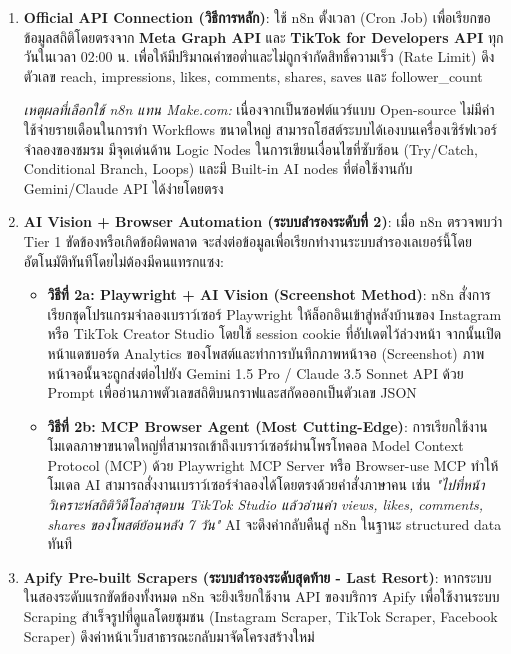 \documentclass[10pt,a4paper]{article}
\begin{document}
\begin{enumerate}[label=\bfseries Tier \arabic*:]
  \item \textbf{Official API Connection (วิธีการหลัก)}:
  ใช้ n8n ตั้งเวลา (Cron Job) เพื่อเรียกขอข้อมูลสถิติโดยตรงจาก \textbf{Meta Graph API} และ \textbf{TikTok for Developers API} ทุกวันในเวลา 02:00 น. เพื่อให้มีปริมาณคำขอต่ำและไม่ถูกจำกัดสิทธิ์ความเร็ว (Rate Limit) ดึงตัวเลข reach, impressions, likes, comments, shares, saves และ follower\_count
  
  \textit{เหตุผลที่เลือกใช้ n8n แทน Make.com:} เนื่องจากเป็นซอฟต์แวร์แบบ Open-source ไม่มีค่าใช้จ่ายรายเดือนในการทำ Workflows ขนาดใหญ่ สามารถโฮสต์ระบบได้เองบนเครื่องเซิร์ฟเวอร์จำลองของชมรม มีจุดเด่นด้าน Logic Nodes ในการเขียนเงื่อนไขที่ซับซ้อน (Try/Catch, Conditional Branch, Loops) และมี Built-in AI nodes ที่ต่อใช้งานกับ Gemini/Claude API ได้ง่ายโดยตรง
  
  \item \textbf{AI Vision + Browser Automation (ระบบสำรองระดับที่ 2)}:
  เมื่อ n8n ตรวจพบว่า Tier 1 ขัดข้องหรือเกิดข้อผิดพลาด จะส่งต่อข้อมูลเพื่อเรียกทำงานระบบสำรองเลเยอร์นี้โดยอัตโนมัติทันทีโดยไม่ต้องมีคนแทรกแซง:
    \begin{itemize}
      \item \textbf{วิธีที่ 2a: Playwright + AI Vision (Screenshot Method)}: n8n สั่งการเรียกชุดโปรแกรมจำลองเบราว์เซอร์ Playwright ให้ล็อกอินเข้าสู่หลังบ้านของ Instagram หรือ TikTok Creator Studio โดยใช้ session cookie ที่อัปเดตไว้ล่วงหน้า จากนั้นเปิดหน้าแดชบอร์ด Analytics ของโพสต์และทำการบันทึกภาพหน้าจอ (Screenshot) ภาพหน้าจอนั้นจะถูกส่งต่อไปยัง Gemini 1.5 Pro / Claude 3.5 Sonnet API ด้วย Prompt เพื่ออ่านภาพตัวเลขสถิติบนกราฟและสกัดออกเป็นตัวเลข JSON
      \item \textbf{วิธีที่ 2b: MCP Browser Agent (Most Cutting-Edge)}: การเรียกใช้งานโมเดลภาษาขนาดใหญ่ที่สามารถเข้าถึงเบราว์เซอร์ผ่านโพรโทคอล Model Context Protocol (MCP) ด้วย Playwright MCP Server หรือ Browser-use MCP ทำให้โมเดล AI สามารถสั่งงานเบราว์เซอร์จำลองได้โดยตรงด้วยคำสั่งภาษาคน เช่น \textit{"ไปที่หน้าวิเคราะห์สถิติวิดีโอล่าสุดบน TikTok Studio แล้วอ่านค่า views, likes, comments, shares ของโพสต์ย้อนหลัง 7 วัน"} AI จะดึงค่ากลับคืนสู่ n8n ในฐานะ structured data ทันที
    \end{itemize}
  
  \item \textbf{Apify Pre-built Scrapers (ระบบสำรองระดับสุดท้าย - Last Resort)}:
  หากระบบในสองระดับแรกขัดข้องทั้งหมด n8n จะยิงเรียกใช้งาน API ของบริการ Apify เพื่อใช้งานระบบ Scraping สำเร็จรูปที่ดูแลโดยชุมชน (Instagram Scraper, TikTok Scraper, Facebook Scraper) ดึงค่าหน้าเว็บสาธารณะกลับมาจัดโครงสร้างใหม่
\end{enumerate}
\end{document}
